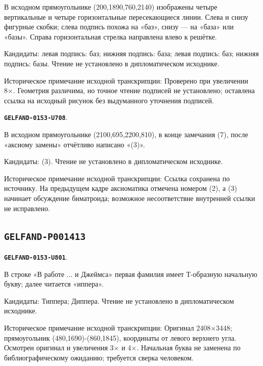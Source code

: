 \documentclass[11pt]{article}
\theoremstyle{definition}
\theoremstyle{remark}
\begin{document}
В исходном прямоугольнике (200,1890,760,2140) изображены четыре вертикальные и четыре горизонтальные пересекающиеся линии. Слева и снизу фигурные скобки; слева подпись похожа на «баз», снизу — на «база» или «базы». Справа горизонтальная стрелка направлена влево к решётке.\par
Кандидаты: левая подпись: баз; нижняя подпись: база; левая подпись: баз; нижняя подпись: базы. Чтение не установлено в дипломатическом исходнике.\par
Историческое примечание исходной транскрипции: Проверено при увеличении 8×. Геометрия различима, но точное чтение подписей не установлено; оставлена ссылка на исходный рисунок без выдуманного уточнения подписей.\par\medskip
\par\noindent\leavevmode{}\label{GELFAND-0153-U708}\label{GELFAND-P001412:basis-axiom-reference:note}\textbf{\texttt{GELFAND-0153-U708}}.\nopagebreak[4]\par
В исходном прямоугольнике (2100,695,2200,810), в конце замечания (7), после «аксиому замены» отчётливо написано «(3)».\par
Кандидаты: (3). Чтение не установлено в дипломатическом исходнике.\par
Историческое примечание исходной транскрипции: Ссылка сохранена по источнику. На предыдущем кадре аксиоматика отмечена номером (2), а (3) начинает обсуждение биматроида; возможное несоответствие внутренней ссылки не исправлено.\par\medskip
\subsection*{\texttt{GELFAND-P001413}}
\par\noindent\leavevmode{}\label{GELFAND-0153-U801}\label{GELFAND-P001413:citation-name:note}\textbf{\texttt{GELFAND-0153-U801}}.\nopagebreak[4]\par
В строке «В работе ... и Джеймса» первая фамилия имеет Т-образную начальную букву; далее читается «иппера».\par
Кандидаты: Типпера; Диппера. Чтение не установлено в дипломатическом исходнике.\par
Историческое примечание исходной транскрипции: Оригинал 2408×3448; прямоугольник (480,1690)-(860,1845), координаты от левого верхнего угла. Осмотрен оригинал и увеличения 3× и 4×. Начальная буква не заменена по библиографическому ожиданию; требуется сверка человеком.\par\medskip
\end{document}
